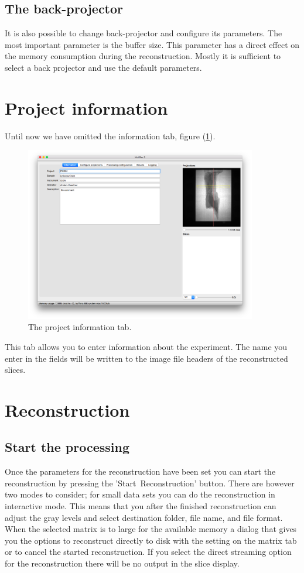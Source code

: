 \documentclass[a4paper]{scrreprt}
\begin{document}
\subsection{The back-projector}
It is also possible to change back-projector and configure its parameters. The most important parameter is the buffer size. This parameter has a direct effect on the memory consumption during the reconstruction. Mostly it is sufficient to select a back projector and use the default parameters.

\section{Project information}
Until now we have omitted the information tab, figure
(\ref{fig_projectinfotab}).
\begin{figure}[ht!]
\centering
\includegraphics[width=0.9\textwidth]{figures3/Main_Information.png}
\caption{The project information tab.}\label{fig_projectinfotab}
\end{figure}
This tab allows you to enter information about the experiment. The name you enter in the fields will be written to the image file headers of the reconstructed slices.

\section{Reconstruction}

\subsection{Start the processing}
Once the parameters for the reconstruction have been set you can start the reconstruction by pressing the 'Start~Reconstruction' button. There are however
two modes to consider; for small data sets you can do the reconstruction in interactive mode. This means that you after the finished reconstruction can adjust the gray levels and select destination folder, file name, and file format. When the selected matrix is to large for the available memory a dialog that gives you the options to reconstruct directly to disk with the setting on the matrix tab or to cancel the started reconstruction. If you select the direct streaming option for the reconstruction there will be no output in the slice display.
\end{document}
